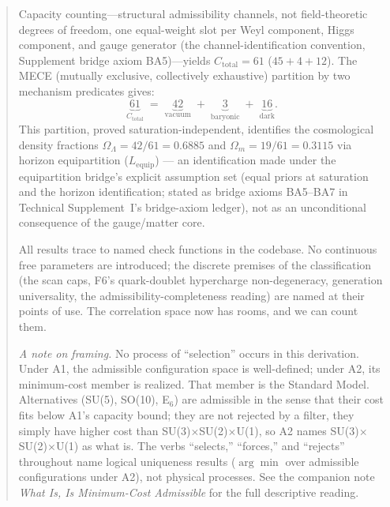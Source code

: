 \documentclass[11pt]{article}
\begin{document}
\begin{abstract}
Capacity counting---structural admissibility channels, not field-theoretic degrees of freedom, one equal-weight slot per Weyl component, Higgs component, and gauge generator (the channel-identification convention, Supplement bridge axiom BA5)---yields $C_{\mathrm{total}} = 61$ ($45 + 4 + 12$).  The MECE (mutually exclusive, collectively exhaustive) partition by two mechanism predicates gives:
\begin{equation}
\underbrace{61}_{C_{\mathrm{total}}} \;=\; \underbrace{42}_{\text{vacuum}} \;+\; \underbrace{3}_{\text{baryonic}} \;+\; \underbrace{16}_{\text{dark}}.
\label{eq:mece_abstract}
\end{equation}
This partition, proved saturation-independent, identifies the cosmological density fractions $\Omega_\Lambda = 42/61 = 0.6885$ and $\Omega_m = 19/61 = 0.3115$ via horizon equipartition ($L_{\mathrm{equip}}$) --- an identification made under the equipartition bridge's explicit assumption set (equal priors at saturation and the horizon identification; stated as bridge axioms BA5--BA7 in Technical Supplement~I's bridge-axiom ledger), not as an unconditional consequence of the gauge/matter core.

All results trace to named check functions in the codebase.  No continuous free parameters are introduced; the discrete premises of the classification (the scan caps, F6's quark-doublet hypercharge non-degeneracy, generation universality, the admissibility-completeness reading) are named at their points of use.  The correlation space now has rooms, and we can count them.

\smallskip\noindent\textit{A note on framing.}  No process of ``selection'' occurs in this derivation.  Under A1, the admissible configuration space is well-defined; under A2, its minimum-cost member is realized.  That member is the Standard Model.  Alternatives (SU(5), SO(10), E$_6$) are admissible in the sense that their cost fits below A1's capacity bound; they are not rejected by a filter, they simply have higher cost than SU(3)$\times$SU(2)$\times$U(1), so A2 names SU(3)$\times$SU(2)$\times$U(1) as what is.  The verbs ``selects,'' ``forces,'' and ``rejects'' throughout name logical uniqueness results ($\arg\min$ over admissible configurations under A2), not physical processes.  See the companion note \emph{What Is, Is Minimum-Cost Admissible} for the full descriptive reading.
\end{abstract}

\tableofcontents
\newpage


\end{document}
